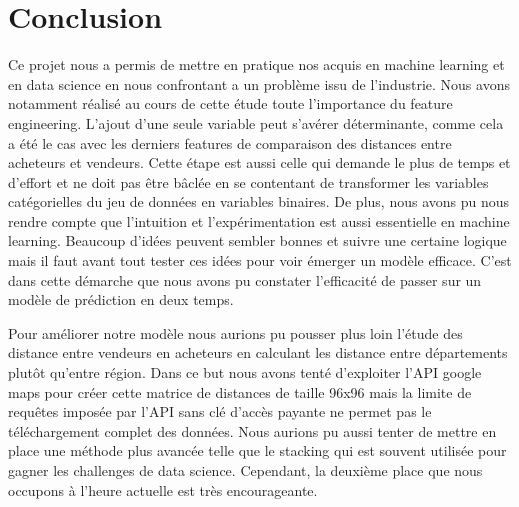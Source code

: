 
\chapter{Conclusion}

Ce projet nous a permis de mettre en pratique nos acquis en machine learning et en data 
science en nous confrontant a un problème issu de l'industrie. Nous avons notamment réalisé
au cours de cette étude toute l'importance du feature engineering. L'ajout d'une seule variable
peut s'avérer déterminante, comme cela a été le cas avec les derniers features de comparaison
des distances entre acheteurs et vendeurs. Cette étape est aussi celle qui demande le plus
de temps et d'effort et ne doit pas être bâclée en se contentant de
transformer les variables catégorielles du jeu de données en variables binaires. De plus,
nous avons pu nous rendre compte que l'intuition et l'expérimentation est aussi 
essentielle en machine learning. Beaucoup d'idées peuvent sembler bonnes et suivre une
certaine logique mais il faut avant tout tester ces idées pour voir émerger un modèle
efficace. C'est dans cette démarche que nous avons pu constater l'efficacité de passer
sur un modèle de prédiction en deux temps.

Pour améliorer notre modèle nous aurions pu pousser plus loin l'étude des distance entre
vendeurs en acheteurs en calculant les distance entre départements plutôt qu'entre région.
Dans ce but nous avons tenté d'exploiter l'API google maps pour créer cette matrice de distances de taille
96x96 mais la limite de requêtes imposée par l'API sans clé d'accès payante ne permet pas 
le téléchargement complet des données. 
Nous aurions pu aussi tenter de mettre en place une méthode plus avancée telle que le 
stacking qui est souvent utilisée pour gagner les challenges de data science. Cependant,
la deuxième place que nous occupons à l'heure actuelle est très encourageante.
